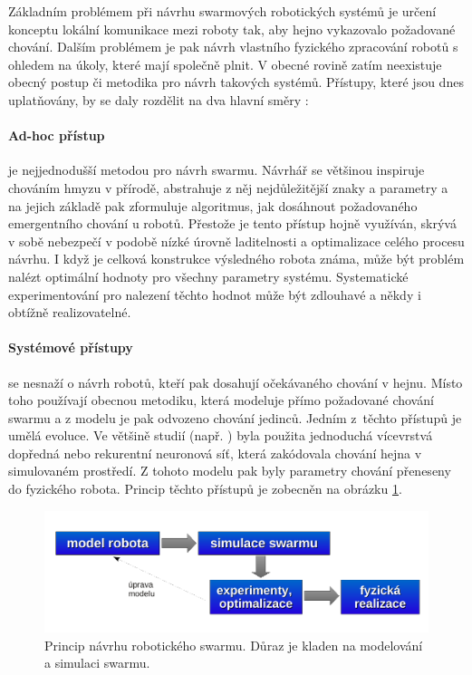 \documentclass[a4paper,12pt]{article}
\begin{document}
Základním problémem při návrhu swarmových robotických systémů je určení konceptu
lokální komunikace mezi roboty tak, aby hejno vykazovalo požadované chování. Dalším
problémem je pak návrh vlastního fyzického zpracování robotů s ohledem na úkoly, které
mají společně plnit. V obecné rovině zatím neexistuje obecný postup či metodika pro návrh
takových systémů. Přístupy, které jsou dnes uplatňovány, by se daly rozdělit na dva
hlavní směry \cite[s.90-91]{Blum08SwarmInt}:

\paragraph{Ad-hoc přístup} je nejjednodušší metodou pro návrh swarmu. Návrhář se většinou
inspiruje chováním hmyzu v přírodě, abstrahuje z něj nejdůležitější znaky a parametry
a na jejich základě pak zformuluje algoritmus, jak dosáhnout požadovaného emergentního
chování u robotů. Přestože je tento přístup hojně využíván, skrývá v sobě nebezpečí v podobě
nízké úrovně laditelnosti a optimalizace celého procesu návrhu. I když je celková konstrukce
výsledného robota známa, může být problém nalézt optimální hodnoty pro všechny parametry systému.
Systematické experimentování pro nalezení těchto hodnot může být zdlouhavé a někdy i obtížně
realizovatelné.

\paragraph{Systémové přístupy} se nesnaží o návrh robotů, kteří pak dosahují očekávaného chování
v hejnu. Místo toho používají obecnou metodiku, která modeluje přímo požadované chování swarmu
a z modelu je pak odvozeno chování jedinců. Jedním z~těchto přístupů je umělá evoluce. Ve většině
studií (např. \cite{Dorigo05}) byla použita jednoduchá vícevrstvá dopředná nebo rekurentní neuronová síť,
která zakódovala chování hejna v simulovaném prostředí. Z tohoto modelu pak byly parametry
chování přeneseny do fyzického robota. Princip těchto přístupů je zobecněn na obrázku
\ref{fig:swarmdesign}.

\begin{figure}[here]
  \centering
  \includegraphics[width=14cm]{./img/swarm_rob_design.pdf}
  \caption{Princip návrhu robotického swarmu. Důraz je kladen na modelování a simulaci swarmu.}
  \label{fig:swarmdesign}
\end{figure}
\end{document}
